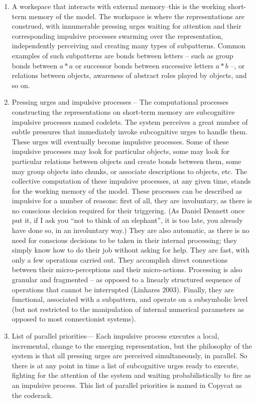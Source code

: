 \documentclass[a4paper]{article}
\begin{document}
\begin{enumerate}

\item A workspace that interacts with external memory--this is the working short-term memory of the model.  The workspace is where the representations are construed, with innumerable pressing urges waiting for attention and their corresponding impulsive processes swarming over the representation, independently perceiving and creating many types of subpatterns.  Common examples of such subpatterns are bonds between letters – such as group bonds between $a*a$ or successor bonds between successive letters $a*b$ –, or relations between objects, awareness of abstract roles played by objects, and so on. 

\item Pressing urges and impulsive processes – The computational processes constructing the representations on short-term memory are subcognitive impulsive processes named codelets.  The system perceives a great number of subtle pressures that immediately invoke subcognitive urges to handle them.  These urges will eventually become impulsive processes. Some of these impulsive processes may look for particular objects, some may look for particular relations between objects and create bonds between them, some may group objects into chunks, or associate descriptions to objects, etc.  The collective computation of these impulsive processes, at any given time, stands for the working memory of the model.  These processes can be described as impulsive for a number of reasons: first of all, they are involuntary, as there is no conscious decision required for their triggering.  (As Daniel Dennett once put it, if I ask you “not to think of an elephant”, it is too late, you already have done so, in an involuntary way.)  They are also automatic, as there is no need for conscious decisions to be taken in their internal processing; they simply know how to do their job without asking for help. They are fast, with only a few operations carried out.  They accomplish direct connections between their micro-perceptions and their micro-actions. Processing is also granular and fragmented – as opposed to a linearly structured sequence of operations that cannot be interrupted (Linhares 2003). Finally, they are functional, associated with a subpattern, and operate on a subsymbolic level (but not restricted to the manipulation of internal numerical parameters as opposed to most connectionist systems).  


\item List of parallel priorities— Each impulsive process executes a local, incremental, change to the emerging representation, but the philosophy of the system is that all pressing urges are perceived simultaneously, in parallel.  So there is at any point in time a list of subcognitive urges ready to execute, fighting for the attention of the system and waiting probabilistically to fire as an impulsive process. This list of parallel priorities is named in Copycat as the coderack.  


\end{enumerate}
\end{document}
